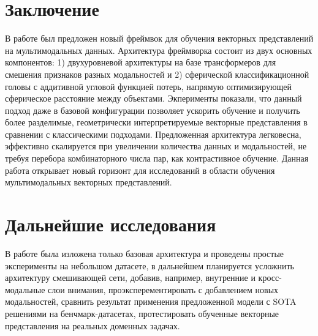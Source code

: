 \documentclass{article}
\begin{document}
\section{Заключение}
В работе был предложен новый фреймвок для обучения векторных представлений на мультимодальных данных. Архитектура фреймворка состоит из двух основных компонентов: 1) двухуровневой архитектуры на базе трансформеров для смешения признаков разных модальностей и 2) сферической классификационной головы с аддитивной угловой функцией потерь, напрямую оптимизирующей сферическое расстояние между объектами.
Экперименты показали, что данный подход даже в базовой конфигурации позволяет ускорить обучение и получить более разделимые, геометрически интерпретируемые векторные представления в сравнении с классическими подходами.
Предложенная архитектура легковесна, эффективно скалируется при увеличении количества данных и модальностей, не требуя перебора комбинаторного числа пар, как контрастивное обучение.
Данная работа открывает новый горизонт для исследований в области обучения мультимодальных векторных представлений.

\section{Дальнейшие исследования}
В работе была изложена только базовая архитектура и проведены простые эксперименты на небольшом датасете, в дальнейшем планируется усложнить архитектуру смешивающей сети, добавив, например, внутренние и кросс-модальные слои внимания, проэксперементировать с добавлением новых модальностей, сравнить результат применения предложенной модели с SOTA решениями на бенчмарк-датасетах, протестировать обученные векторные представления на реальных доменных задачах.

  




\end{document}
